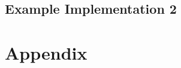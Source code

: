 \documentclass[oneside, a4paper, onecolumn, 11pt]{article}
\begin{document}

\subsection{Example Implementation 2}



\newpage



\newpage
\appendix

\section{Appendix}
\label{sec:appendix}
\end{document}
